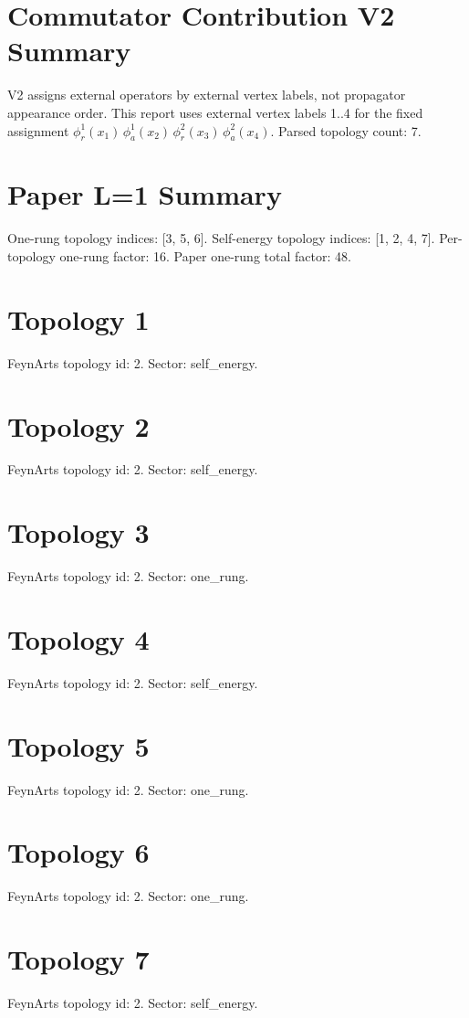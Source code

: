 \documentclass{article}
\begin{document}
\section*{Commutator Contribution V2 Summary}
V2 assigns external operators by external vertex labels, not propagator appearance order.
This report uses external vertex labels 1..4 for the fixed assignment $\phi_r^1(x_1)\,\phi_a^1(x_2)\,\phi_r^2(x_3)\,\phi_a^2(x_4)$.
Parsed topology count: 7.
\section*{Paper L=1 Summary}
One-rung topology indices: [3, 5, 6].
Self-energy topology indices: [1, 2, 4, 7].
Per-topology one-rung factor: 16.
Paper one-rung total factor: 48.
\section*{Topology 1}
FeynArts topology id: 2.
Sector: self\_energy.
\section*{Topology 2}
FeynArts topology id: 2.
Sector: self\_energy.
\section*{Topology 3}
FeynArts topology id: 2.
Sector: one\_rung.
\section*{Topology 4}
FeynArts topology id: 2.
Sector: self\_energy.
\section*{Topology 5}
FeynArts topology id: 2.
Sector: one\_rung.
\section*{Topology 6}
FeynArts topology id: 2.
Sector: one\_rung.
\section*{Topology 7}
FeynArts topology id: 2.
Sector: self\_energy.
\end{document}
